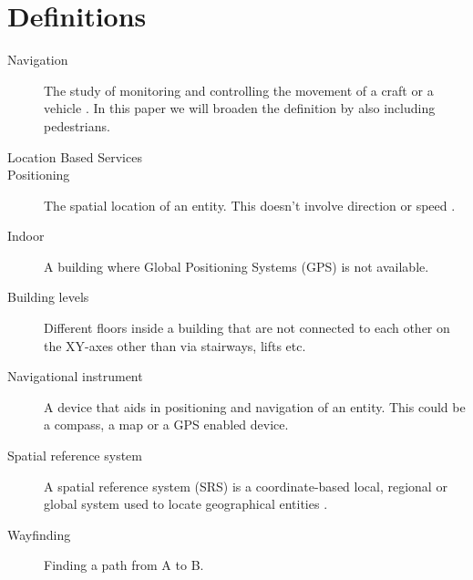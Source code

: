 \section{Definitions} %
\label{sec:definitions}

\begin{description}
	\item[Navigation] The study of monitoring and controlling the movement of a craft or a vehicle \cite{wiki_navi}. In this paper we will broaden the definition by also including pedestrians.

	\item[Location Based Services] 
	
	\item[Positioning] The spatial location of an entity. This doesn't involve direction or speed \cite{wiki_pos}.
	
	\item[Indoor] A building where Global Positioning Systems (GPS) is not available.
	
	\item[Building levels] Different floors inside a building that are not connected to each other on the XY-axes other than via stairways, lifts etc.
	
	\item[Navigational instrument] A device that aids in positioning and navigation of an entity. This could be a compass, a map or a GPS enabled device.
	
	
	\item[Spatial reference system] A spatial reference system (SRS) is a coordinate-based local, regional or global system used to locate geographical entities \cite{wiki_srs}.

	\item[Wayfinding]Finding a path from A to B.

\end{description}

